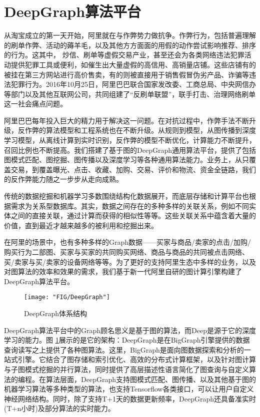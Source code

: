 \section{DeepGraph算法平台}

从淘宝成立的第一天开始，阿里就在与作弊势力做抗争。作弊行为，包括普遍理解的刷单作弊、活动的薅羊毛，以及其他方方面面的用假的动作尝试影响推荐、排序的行为。这其中，
炒信、刷单等虚假交易产业，甚至还会为各类网络违法犯罪活动提供犯罪工具或便利，如催生出大量虚假的高信用、高销量店铺。这些店铺有的被挂在第三方网站进行高价售卖，有的则被直接用于销售假冒伪劣产品、诈骗等违法犯罪行为。2016年10月25日，阿里巴巴联合国家发改委、工商总局、中央网信办等部门以及其他互联网公司，共同组建了“反刷单联盟”，联手打击、治理网络刷单这一社会痛点问题。

阿里巴巴每年投入巨大的精力用于解决这一问题。在对抗过程中，作弊手法不断升级，反作弊的算法模型和工程系统也在不断升级。从规则到模型，从图传播到深度学习模型，从离线计算到实时识别，反作弊的模型不断优化，计算能力不断提升，召回比例也不断提高。我们搭建了基于图的DeepGraph通用算法平台，提供了包括图模式匹配、图挖掘、图传播以及深度学习等各种通用算法能力。业务上，从只覆盖交易，到覆盖曝光、点击、收藏、加购、交易、评价和物流、资金全链路，我们的反作弊能力随之一步步从走向成熟。

传统的数据挖掘和机器学习多数围绕结构化数据展开，而底层存储和计算平台也根据需求为关系型数据库。其实，数据之间存在的多种多样的关联关系，例如不同实体之间的直接关联，通过计算而获得的相似性等等。这些关联关系中蕴含着大量的价值，直到最近才越来越多的被利用和挖掘出来。

在阿里的场景中，也有多种多样的Graph数据——买家与商品/卖家的点击/加购/购买行为二部图、买家与买家的共同购买网络、商品与商品的共同被点击网络、买/卖家与买/卖家的设备网络等等。为了更好的支持阿里生态中多样的业务，以及对图算法的效率和效果的需求，我们基于新一代阿里自研的图计算引擎构建了DeepGraph算法平台。

\begin{figure}
	\centering
	\texttt{[image: "FIG/DeepGraph"]}
	\caption{DeepGraph体系结构}
	\label{fig:chap12_deep_graph}
\end{figure}


DeepGraph算法平台中的Graph顾名思义是基于图的算法，而Deep是源于它的深度学习的能力。图
\ref{fig:chap12_deep_graph}展示的是它的架构：DeepGraph是在BigGraph引擎提供的数据查询读写之上提供了各种图算法。这里，BigGraph是面向图数据探索和分析的一站式引擎。它结合了图存储和索引优化、高效的分布式计算框架，以及针对图计算与子图模式挖掘的并行算法，同时提供了高层描述性语言简化了图查询与自定义算法的编程。在算法层面，DeepGraph支持图模式匹配、图传播、以及其他基于图的机器学习算法等多种类型的算法，也支持Tensorflow各类接口，可以让用户自定义神经网络结构。同时，除了支持T+1天的数据更新频率，DeepGraph还具备准实时(T+n小时)及部分算法的实时能力。

